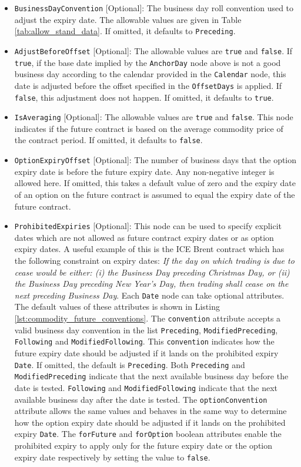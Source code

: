 \begin{itemize}
\item \lstinline!BusinessDayConvention! [Optional]: The business day roll convention used to adjust the expiry date. The allowable values are given in Table \ref{tab:allow_stand_data}. If omitted, it defaults to \lstinline!Preceding!.
\item \lstinline!AdjustBeforeOffset! [Optional]: The allowable values are \lstinline!true! and \lstinline!false!. If \lstinline!true!, if the base date implied by the \lstinline!AnchorDay! node above is not a good business day according to the calendar provided in the \lstinline!Calendar! node, this date is adjusted before the offset specified in the \lstinline!OffsetDays! is applied. If \lstinline!false!, this adjustment does not happen. If omitted, it defaults to \lstinline!true!.
\item \lstinline!IsAveraging! [Optional]: The allowable values are \lstinline!true! and \lstinline!false!. This node indicates if the future contract is based on the average commodity price of the contract period. If omitted, it defaults to \lstinline!false!.
\item \lstinline!OptionExpiryOffset! [Optional]: The number of business days that the option expiry date is before the future expiry date. Any non-negative integer is allowed here. If omitted, this takes a default value of zero and the expiry date of an option on the future contract is assumed to equal the expiry date of the future contract.
\item \lstinline!ProhibitedExpiries! [Optional]: This node can be used to specify explicit dates which are not allowed as future contract expiry dates or as option expiry dates. A useful example of this is the ICE Brent contract which has the following constraint on expiry dates: \emph{If the day on which trading is due to cease would be either: (i) the Business Day preceding Christmas Day, or (ii) the Business Day preceding New Year’s Day, then trading shall cease on the next preceding Business Day}. Each \lstinline!Date! node can take optional attributes. The default values of these attributes is shown in Listing \ref{lst:commodity_future_conventions}. The \lstinline!convention! attribute accepts a valid business day convention in the list \lstinline!Preceding!, \lstinline!ModifiedPreceding!, \lstinline!Following! and \lstinline!ModifiedFollowing!. This \lstinline!convention! indicates how the future expiry date should be adjusted if it lands on the prohibited expiry \lstinline!Date!. If omitted, the default is \lstinline!Preceding!. Both \lstinline!Preceding! and \lstinline!ModifiedPreceding! indicate that the next available business day before the date is tested. \lstinline!Following! and \lstinline!ModifiedFollowing! indicate that the next available business day after the date is tested. The \lstinline!optionConvention! attribute allows the same values and behaves in the same way to determine how the option expiry date should be adjusted if it lands on the prohibited expiry \lstinline!Date!. The \lstinline!forFuture! and \lstinline!forOption! boolean attributes enable the prohibited expiry to apply only for the future expiry date or the option expiry date respectively by setting the value to \lstinline!false!.

\end{itemize}
